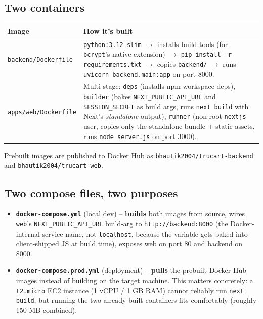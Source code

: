 \documentclass[11pt,a4paper]{article}
\begin{document}
\subsection{Two containers}
\begin{center}
\begin{tabular}{@{}p{3.4cm}p{9.4cm}@{}}
\toprule
\textbf{Image} & \textbf{How it's built} \\
\midrule
\texttt{backend/Dockerfile} & \texttt{python:3.12-slim} $\to$ installs build tools (for
\texttt{bcrypt}'s native extension) $\to$ \texttt{pip install -r requirements.txt} $\to$ copies
\texttt{backend/} $\to$ runs \texttt{uvicorn backend.main:app} on port 8000. \\
\texttt{apps/web/Dockerfile} & Multi-stage: \texttt{deps} (installs npm workspace deps),
\texttt{builder} (bakes \texttt{NEXT\_PUBLIC\_API\_URL} and \texttt{SESSION\_SECRET} as build
args, runs \texttt{next build} with Next's \emph{standalone} output), \texttt{runner}
(non-root \texttt{nextjs} user, copies only the standalone bundle + static assets, runs
\texttt{node server.js} on port 3000). \\
\bottomrule
\end{tabular}
\end{center}
Prebuilt images are published to Docker Hub as \texttt{bhautik2004/trucart-backend} and
\texttt{bhautik2004/trucart-web}.

\subsection{Two compose files, two purposes}
\begin{itemize}[itemsep=2pt]
\item \textbf{\texttt{docker-compose.yml}} (local dev) -- \textbf{builds} both images from
source, wires \texttt{web}'s \texttt{NEXT\_PUBLIC\_API\_URL} build-arg to
\texttt{http://backend:8000} (the Docker-internal service name, not \texttt{localhost}, because
the variable gets baked into client-shipped JS at build time), exposes web on port 80 and
backend on 8000.
\item \textbf{\texttt{docker-compose.prod.yml}} (deployment) -- \textbf{pulls} the prebuilt
Docker Hub images instead of building on the target machine. This matters concretely: a
\texttt{t2.micro} EC2 instance (1 vCPU / 1 GB RAM) cannot reliably run \texttt{next build}, but
running the two already-built containers fits comfortably (roughly 150 MB combined).
\end{itemize}
\end{document}
